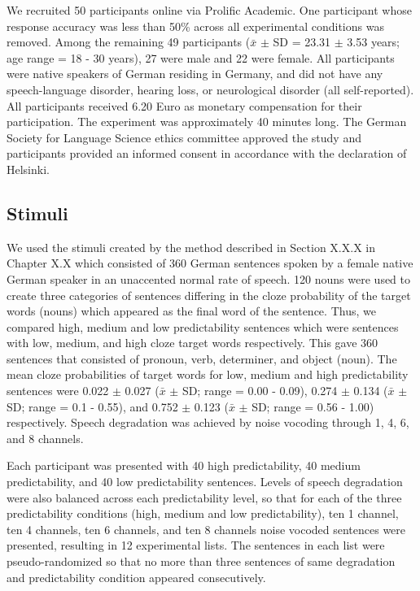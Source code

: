 \documentclass[a4paper, nobind]{templates/ociamthesis}
\begin{document}
We recruited 50 participants online via Prolific Academic.
One participant whose response accuracy was less than 50\% across all experimental conditions was removed.
Among the remaining 49 participants (\(\bar{x}\) \(\pm\) SD = 23.31 \(\pm\) 3.53 years; age range = 18 - 30 years), 27 were male and 22 were female.
All participants were native speakers of German residing in Germany, and did not have any speech-language disorder, hearing loss, or neurological disorder (all self-reported).
All participants received 6.20 Euro as monetary compensation for their participation.
The experiment was approximately 40 minutes long.
The German Society for Language Science ethics committee approved the study and participants provided an informed consent in accordance with the declaration of Helsinki.

\hypertarget{stimuli}{%
\subsection{Stimuli}\label{stimuli}}

We used the stimuli created by the method described in Section X.X.X in Chapter X.X which consisted of 360 German sentences spoken by a female native German speaker in an unaccented normal rate of speech.
120 nouns were used to create three categories of sentences differing in the cloze probability of the target words (nouns) which appeared as the final word of the sentence.
Thus, we compared high, medium and low predictability sentences which were sentences with low, medium, and high cloze target words respectively.
This gave 360 sentences that consisted of pronoun, verb, determiner, and object (noun).
The mean cloze probabilities of target words for low, medium and high predictability sentences were 0.022 \(\pm\) 0.027 (\(\bar{x}\) \(\pm\) SD; range = 0.00 - 0.09), 0.274 \(\pm\) 0.134 (\(\bar{x}\) \(\pm\) SD; range = 0.1 - 0.55), and 0.752 \(\pm\) 0.123 (\(\bar{x}\) \(\pm\) SD; range = 0.56 - 1.00) respectively.
Speech degradation was achieved by noise vocoding through 1, 4, 6, and 8 channels.

Each participant was presented with 40 high predictability, 40 medium predictability, and 40 low predictability sentences.
Levels of speech degradation were also balanced across each predictability level, so that for each of the three predictability conditions (high, medium and low predictability), ten 1 channel, ten 4 channels, ten 6 channels, and ten 8 channels noise vocoded sentences were presented, resulting in 12 experimental lists.
The sentences in each list were pseudo-randomized so that no more than three sentences of same degradation and predictability condition appeared consecutively.
\end{document}
